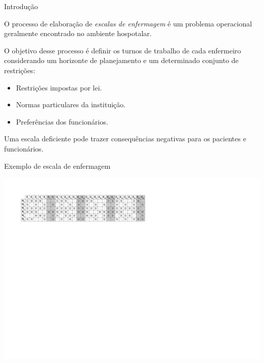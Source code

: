 \documentclass[8pt,mathserif,professionalfont]{beamer}
\begin{document}
\begin{frame}{Introdução} %

   O processo de elaboração de \emph{escalas de enfermagem} é um problema operacional geralmente encontrado no ambiente hospotalar. 
   \medskip
   
   O objetivo desse processo é definir os turnos de trabalho de cada enfermeiro considerando um horizonte de planejamento e um determinado conjunto de restrições:
   	
   \begin{itemize}
      \item Restrições impostas por lei.
      \item Normas particulares da instituição.
      \item Preferências dos funcionários.
   \end{itemize}
   \medskip
   Uma escala deficiente pode trazer consequências negativas para os pacientes e funcionários.


\end{frame}

\begin{frame}{Exemplo de escala de enfermagem} %
   \begin{center}
   \includegraphics[scale=0.55]{tabelaGeral.pdf} 
   \end{center}
\end{frame}
\end{document}
